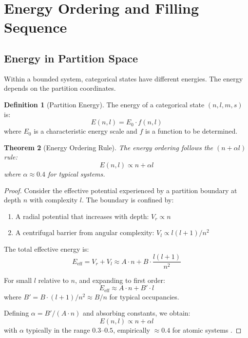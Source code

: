 \documentclass[twocolumn,10pt,a4paper]{article}
\newtheorem{theorem}{Theorem}[section]
\theoremstyle{definition}
\newtheorem{definition}[theorem]{Definition}
\theoremstyle{remark}
\begin{document}
\section{Energy Ordering and Filling Sequence}
\label{sec:energy}

\subsection{Energy in Partition Space}

Within a bounded system, categorical states have different energies. The energy depends on the partition coordinates.

\begin{definition}[Partition Energy]
The energy of a categorical state $(n, l, m, s)$ is:
\begin{equation}
    E(n, l) = E_0 \cdot f(n, l)
\end{equation}
where $E_0$ is a characteristic energy scale and $f$ is a function to be determined.
\end{definition}

\begin{theorem}[Energy Ordering Rule]
\label{thm:energy_ordering}
The energy ordering follows the $(n + \alpha l)$ rule:
\begin{equation}
    E(n, l) \propto n + \alpha l
\end{equation}
where $\alpha \approx 0.4$ for typical systems.
\end{theorem}

\begin{proof}
Consider the effective potential experienced by a partition boundary at depth $n$ with complexity $l$. The boundary is confined by:
\begin{enumerate}
    \item A radial potential that increases with depth: $V_r \propto n$
    \item A centrifugal barrier from angular complexity: $V_l \propto l(l+1)/n^2$
\end{enumerate}

The total effective energy is:
\begin{equation}
    E_{\text{eff}} = V_r + V_l \approx A \cdot n + B \cdot \frac{l(l+1)}{n^2}
\end{equation}

For small $l$ relative to $n$, and expanding to first order:
\begin{equation}
    E_{\text{eff}} \approx A \cdot n + B' \cdot l
\end{equation}
where $B' = B \cdot (l+1)/n^2 \approx B/n$ for typical occupancies.

Defining $\alpha = B'/(A \cdot n)$ and absorbing constants, we obtain:
\begin{equation}
    E(n, l) \propto n + \alpha l
\end{equation}
with $\alpha$ typically in the range $0.3$--$0.5$, empirically $\approx 0.4$ for atomic systems \cite{madelung1936}.
\end{proof}
\end{document}
